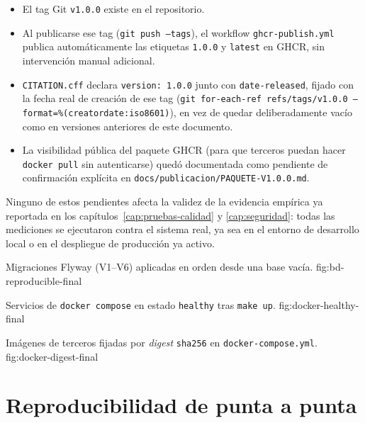 \begin{itemize}[nosep]
  \item El tag Git \texttt{v1.0.0} existe en el repositorio.
  \item Al publicarse ese tag (\texttt{git push --tags}), el workflow
    \texttt{ghcr-publish.yml} publica autom\'aticamente las etiquetas
    \texttt{1.0.0} y \texttt{latest} en GHCR, sin intervenci\'on manual
    adicional.
  \item \texttt{CITATION.cff} declara \texttt{version: 1.0.0} junto con
    \texttt{date-released}, fijado con la fecha real de creaci\'on de ese
    tag (\texttt{git for-each-ref refs/tags/v1.0.0 --format=\%(creatordate:iso8601)}),
    en vez de quedar deliberadamente vac\'io como en versiones anteriores
    de este documento.
  \item La visibilidad p\'ublica del paquete GHCR (para que terceros puedan
    hacer \texttt{docker pull} sin autenticarse) qued\'o documentada como
    pendiente de confirmaci\'on expl\'icita en
    \texttt{docs/publicacion/PAQUETE-V1.0.0.md}.
\end{itemize}

Ninguno de estos pendientes afecta la validez de la evidencia emp\'irica ya
reportada en los cap\'itulos~\ref{cap:pruebas-calidad} y
\ref{cap:seguridad}: todas las mediciones se ejecutaron contra el sistema
real, ya sea en el entorno de desarrollo local o en el despliegue de
producci\'on ya activo.

%
{Migraciones Flyway (V1--V6) aplicadas en orden desde una base vac\'ia.}%
{fig:bd-reproducible-final}

%
{Servicios de \texttt{docker compose} en estado \texttt{healthy} tras \texttt{make up}.}%
{fig:docker-healthy-final}

%
{Im\'agenes de terceros fijadas por \emph{digest} \texttt{sha256} en \texttt{docker-compose.yml}.}%
{fig:docker-digest-final}

\section{Reproducibilidad de punta a punta}

